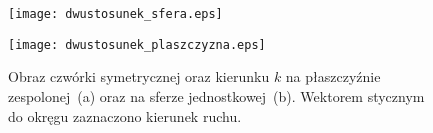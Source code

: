 \begin{figure}[h]\vspace{-0.5cm}
\begin{minipage}[b]{.5\linewidth}
\centering
\texttt{[image: dwustosunek\_sfera.eps]}
\subcaption{}\label{4aaa}
\end{minipage}
\begin{minipage}[b]{.5\linewidth}
\centering
\texttt{[image: dwustosunek\_plaszczyzna.eps]}
\subcaption{}\label{4bbb}
\end{minipage}
\caption{Obraz czwórki symetrycznej oraz kierunku $k$ na płaszczyźnie 
zespolonej~(a) oraz na sferze jednostkowej~(b). 
Wektorem stycznym do okręgu zaznaczono 
kierunek ruchu.}
\label{dwustosunek_plaszczyzna}
\end{figure}
